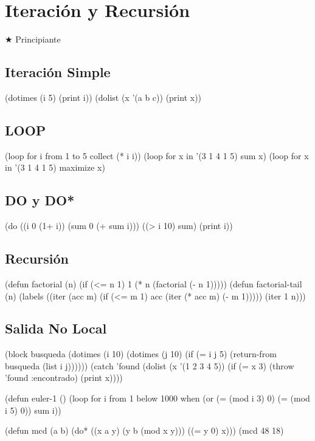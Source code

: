 \chapter{Iteración y Recursión}
\label{chap:iteration}
{\huge$\bigstar$} Principiante

\section{Iteración Simple}
\begin{lispcode}
(dotimes (i 5) (print i))
(dolist (x '(a b c)) (print x))
\end{lispcode}

\section{LOOP}
\begin{lispcode}
(loop for i from 1 to 5 collect (* i i))
(loop for x in '(3 1 4 1 5) sum x)
(loop for x in '(3 1 4 1 5) maximize x)
\end{lispcode}

\section{DO y DO*}
\begin{lispcode}
(do ((i 0 (1+ i)) (sum 0 (+ sum i))) ((> i 10) sum) (print i))
\end{lispcode}

\section{Recursión}
\begin{lispcode}
(defun factorial (n) (if (<= n 1) 1 (* n (factorial (- n 1)))))
(defun factorial-tail (n)
  (labels ((iter (acc m) (if (<= m 1) acc (iter (* acc m) (- m 1)))))
    (iter 1 n)))
\end{lispcode}

\section{Salida No Local}
\begin{lispcode}
(block busqueda
  (dotimes (i 10) (dotimes (j 10) (if (= i j 5) (return-from busqueda (list i j))))))
(catch 'found
  (dolist (x '(1 2 3 4 5)) (if (= x 3) (throw 'found :encontrado) (print x))))
\end{lispcode}

\begin{examplebox}[title=LOOP para Project Euler \#1]
\begin{lispcode}
(defun euler-1 ()
  (loop for i from 1 below 1000
        when (or (= (mod i 3) 0) (= (mod i 5) 0)) sum i))
\end{lispcode}
\end{examplebox}

\begin{examplebox}[title=MCD con DO*]
\begin{lispcode}
(defun mcd (a b) (do* ((x a y) (y b (mod x y))) ((= y 0) x)))
(mcd 48 18)
\end{lispcode}
\end{examplebox}

